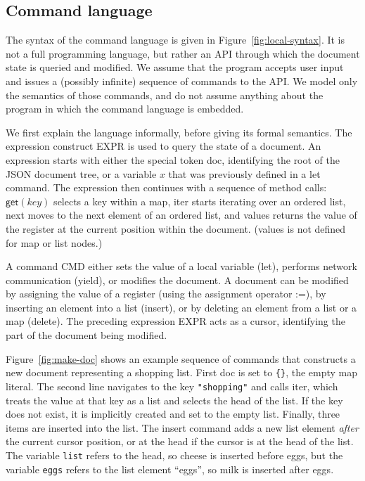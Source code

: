 \documentclass[a4paper,twocolumn,10pt]{article}
\begin{document}
\subsection{Command language}

The syntax of the command language is given in Figure~\ref{fig:local-syntax}. It is not a full programming language, but rather an API through which the document state is queried and modified. We assume that the program accepts user input and issues a (possibly infinite) sequence of commands to the API. We model only the semantics of those commands, and do not assume anything about the program in which the command language is embedded.

We first explain the language informally, before giving its formal semantics. The expression construct EXPR is used to query the state of a document. An expression starts with either the special token \textsf{doc}, identifying the root of the JSON document tree, or a variable $x$ that was previously defined in a \textsf{let} command. The expression then continues with a sequence of method calls: $\mathsf{get}(\mathit{key})$ selects a key within a map, \textsf{iter} starts iterating over an ordered list, \textsf{next} moves to the next element of an ordered list, and \textsf{values} returns the value of the register at the current position within the document. (\textsf{values} is not defined for map or list nodes.)

A command CMD either sets the value of a local variable (\textsf{let}), performs network communication (\textsf{yield}), or modifies the document. A document can be modified by assigning the value of a register (using the assignment operator :=), by inserting an element into a list (\textsf{insert}), or by deleting an element from a list or a map (\textsf{delete}). The preceding expression EXPR acts as a cursor, identifying the part of the document being modified.

Figure~\ref{fig:make-doc} shows an example sequence of commands that constructs a new document representing a shopping list. First \textsf{doc} is set to \verb|{}|, the empty map literal. The second line navigates to the key \verb|"shopping"| and calls \textsf{iter}, which treats the value at that key as a list and selects the head of the list. If the key does not exist, it is implicitly created and set to the empty list. Finally, three items are inserted into the list. The \textsf{insert} command adds a new list element \emph{after} the current cursor position, or at the head if the cursor is at the head of the list. The variable \verb|list| refers to the head, so cheese is inserted before eggs, but the variable \verb|eggs| refers to the list element ``eggs'', so milk is inserted after eggs.
\end{document}
